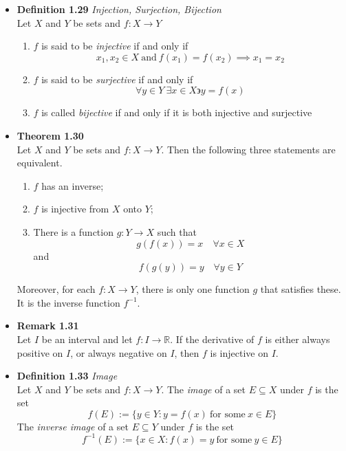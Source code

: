 \documentclass[11pt,a4paper]{article}
\begin{document}
\begin{itemize}
    \item \textbf{Definition 1.29} \emph{Injection, Surjection, Bijection} \\
        Let $X$ and $Y$ be sets and $f : X \to Y$
        \begin{enumerate}
            \item $f$ is said to be \emph{injective} if and only if
                \[
                    x_1, x_2 \in X \ \text{and} \ f(x_1) = f(x_2) \implies x_1 = x_2
                \]
            \item $f$ is said to be \emph{surjective} if and only if
                \[
                    \forall y \in Y \ \exists x \in X \backepsilon y = f(x)
                \]

            \item $f$ is called \emph{bijective} if and only if it is both injective
                and surjective
        \end{enumerate}

    \item \textbf{Theorem 1.30} \\
        Let $X$ and $Y$ be sets and $f : X \to Y$.
        Then the following three statements are equivalent.
        \begin{enumerate}
            \item $f$ has an inverse;
            \item $f$ is injective from $X$ onto $Y$;
            \item There is a function $g : Y \to X$ such that
                \[
                    g(f(x)) = x \quad \forall x \in X
                \]
                and
                \[
                    f(g(y)) = y \quad \forall y \in Y
                \]
        \end{enumerate}
        Moreover, for each $f : X \to Y$, there is only one function $g$ that satisfies these.
        It is the inverse function $f^{-1}$.

    \item \textbf{Remark 1.31} \\
        Let $I$ be an interval and let $f : I \to \mathbb{R}$.
        If the derivative of $f$ is either always positive on $I$, or always negative on $I$,
        then $f$ is injective on $I$.

    \item \textbf{Definition 1.33} \emph{Image} \\
        Let $X$ and $Y$ be sets and $f : X \to Y$.
        The \emph{image} of a set $E \subseteq X$ under $f$ is the set
        \[
            f(E) := \{ y \in Y : y = f(x) \ \text{for some} \ x \in E \}
        \]
        The \emph{inverse image} of a set $E \subseteq Y$ under $f$ is the set
        \[
            f^{-1}(E) := \{ x \in X : f(x) = y \ \text{for some} \ y \in E \}
        \]


\end{itemize}
\end{document}
